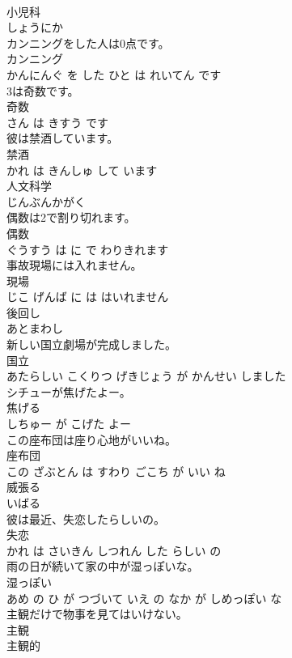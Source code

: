 \documentclass[8pt]{extreport}
\begin{document}
\begin{CJK}{UTF8}{min}
\\	小児科	
\\	しょうにか			
\\	カンニングをした人は0点です。	
\\	カンニング 
\\	かんにんぐ を した ひと は れいてん です			
\\	3は奇数です。	
\\	奇数 
\\	さん は きすう です			
\\	彼は禁酒しています。	
\\	禁酒 
\\	かれ は きんしゅ して います			
\\	人文科学	
\\	じんぶんかがく			
\\	偶数は2で割り切れます。	
\\	偶数 
\\	ぐうすう は に で わりきれます			
\\	事故現場には入れません。	
\\	現場 
\\	じこ げんば に は はいれません			
\\	後回し	
\\	あとまわし			
\\	新しい国立劇場が完成しました。	
\\	国立 
\\	あたらしい こくりつ げきじょう が かんせい しました			
\\	シチューが焦げたよー。	
\\	焦げる 
\\	しちゅー が こげた よー			
\\	この座布団は座り心地がいいね。	
\\	座布団 
\\	この ざぶとん は すわり ごこち が いい ね			
\\	威張る	
\\	いばる			
\\	彼は最近、失恋したらしいの。	
\\	失恋 
\\	かれ は さいきん しつれん した らしい の			
\\	雨の日が続いて家の中が湿っぽいな。	
\\	湿っぽい 
\\	あめ の ひ が つづいて いえ の なか が しめっぽい な			
\\	主観だけで物事を見てはいけない。	
\\	主観 
\\	主観的 

\end{CJK}
\end{document}
